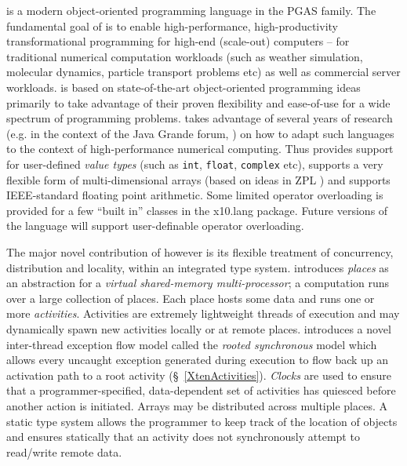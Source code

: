 \Xten{} is a modern object-oriented programming language
in the PGAS family. The fundamental goal of \Xten{} is to enable
high-performance, high-productivity transformational programming for
high-end (scale-out) computers -- for traditional numerical
computation workloads (such as weather simulation, molecular dynamics,
particle transport problems etc) as well as commercial server
workloads. 
\Xten{} is based on state-of-the-art object-oriented
programming ideas primarily to take advantage of their proven
flexibility and ease-of-use for a wide spectrum of programming
problems. \Xten{} takes advantage of several years of research (e.g.{}
in the context of the Java Grande forum,
\cite{moreira00java,kava}) on how to adapt such languages to the context of
high-performance numerical computing. Thus \Xten{} provides support
for user-defined {\em value types} (such as {\tt int}, {\tt float},
{\tt complex} etc), supports a very
flexible form of multi-dimensional arrays (based on ideas in ZPL
\cite{zpl}) and supports IEEE-standard floating point arithmetic.
Some limited operator overloading is provided for a few ``built in''
classes in the {\cf x10.lang} package.  Future versions of the
language will support user-definable operator overloading.

The major novel contribution of \Xten{} however is its flexible
treatment of concurrency, distribution and locality, within an
integrated type system. \Xten{} introduces {\em places} as an
abstraction for a {\em virtual shared-memory multi-processor}; a
computation runs over a large collection of places. Each place hosts
some data and runs one or more {\em activities}. Activities are
extremely lightweight threads of execution and may dynamically spawn
new activities locally or at remote places. \Xten{} introduces a novel
inter-thread exception flow model called the {\em rooted synchronous}
model which allows every uncaught exception generated during execution
to flow back up an activation path to a root activity
(\S~\ref{XtenActivities}).  {\em Clocks} are used to ensure that a
programmer-specified, data-dependent set of activities has quiesced
before another action is initiated. Arrays may be distributed across
multiple places. A static type system allows the programmer to keep
track of the location of objects and ensures statically that an
activity does not synchronously attempt to read/write remote data.

